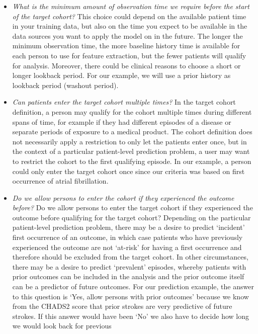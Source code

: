 \documentclass[]{book}
\begin{document}
\begin{itemize}
\item
  \emph{What is the minimum amount of observation time we require before
  the start of the target cohort?} This choice could depend on the
  available patient time in your training data, but also on the time you
  expect to be available in the data sources you want to apply the model
  on in the future. The longer the minimum observation time, the more
  baseline history time is available for each person to use for feature
  extraction, but the fewer patients will qualify for analysis.
  Moreover, there could be clinical reasons to choose a short or longer
  lookback period. For our example, we will use a prior history as
  lookback period (washout period).
\item
  \emph{Can patients enter the target cohort multiple times?} In the
  target cohort definition, a person may qualify for the cohort multiple
  times during different spans of time, for example if they had
  different episodes of a disease or separate periods of exposure to a
  medical product. The cohort definition does not necessarily apply a
  restriction to only let the patients enter once, but in the context of
  a particular patient-level prediction problem, a user may want to
  restrict the cohort to the first qualifying episode. In our example, a
  person could only enter the target cohort once since our criteria was
  based on first occurrence of atrial fibrillation.
\item
  \emph{Do we allow persons to enter the cohort if they experienced the
  outcome before?} Do we allow persons to enter the target cohort if
  they experienced the outcome before qualifying for the target cohort?
  Depending on the particular patient-level prediction problem, there
  may be a desire to predict `incident' first occurrence of an outcome,
  in which case patients who have previously experienced the outcome are
  not `at-risk' for having a first occurrence and therefore should be
  excluded from the target cohort. In other circumstances, there may be
  a desire to predict `prevalent' episodes, whereby patients with prior
  outcomes can be included in the analysis and the prior outcome itself
  can be a predictor of future outcomes. For our prediction example, the
  answer to this question is `Yes, allow persons with prior outcomes'
  because we know from the CHADS2 score that prior strokes are very
  predictive of future strokes. If this answer would have been `No' we
  also have to decide how long we would look back for previous

\end{itemize}
\end{document}

